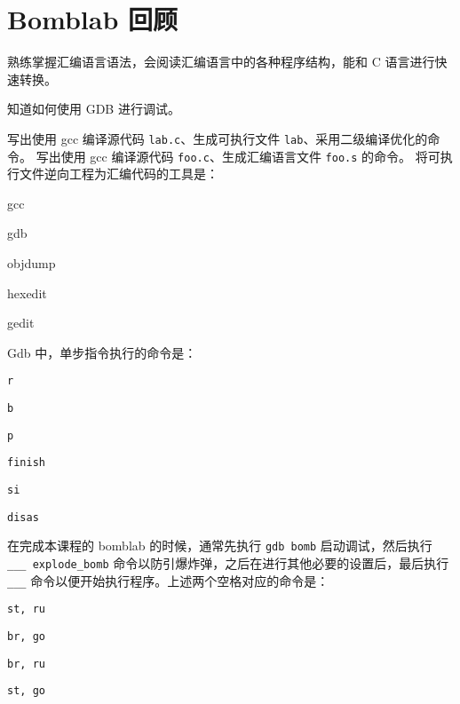 \chapter{Bomblab 回顾}
    \begin{summary}
        \begin{compactitem}
            \item 熟练掌握汇编语言语法，会阅读汇编语言中的各种程序结构，能和 C 语言进行快速转换。
            \item 知道如何使用 GDB 进行调试。
        \end{compactitem}
    \end{summary}

    \begin{problems}
        \pro 写出使用 gcc 编译源代码 \verb|lab.c|、生成可执行文件 \verb|lab|、采用二级编译优化的命令。
        \pro 写出使用 gcc 编译源代码 \verb|foo.c|、生成汇编语言文件 \verb|foo.s| 的命令。
        \pro 将可执行文件逆向工程为汇编代码的工具是：
        \begin{choices}
            \item gcc
            \item gdb
            \item objdump
            \item hexedit
            \item gedit
        \end{choices}
        \pro Gdb 中，单步指令执行的命令是：
        \begin{choices}
            \item \verb|r|
            \item \verb|b|
            \item \verb|p|
            \item \verb|finish|
            \item \verb|si|
            \item \verb|disas|
        \end{choices}
         在完成本课程的 bomblab 的时候，通常先执行 \verb|gdb bomb| 启动调试，然后执行 \verb|___ explode_bomb| 命令以防引爆炸弹，之后在进行其他必要的设置后，最后执行 \verb|___| 命令以便开始执行程序。上述两个空格对应的命令是：
        \begin{choices}
            \item \verb|st, ru|
            \item \verb|br, go|
            \item \verb|br, ru|
            \item \verb|st, go|
        \end{choices}
    \end{problems}